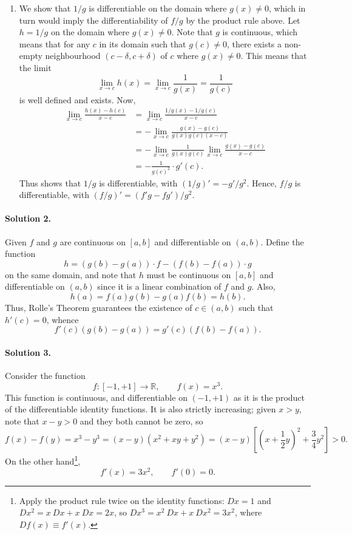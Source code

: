 \documentclass[10pt]{article}
\def\R{\mathbb{R}}
\begin{document}
\begin{enumerate}
        \item We show that $1 /g$ is differentiable on the domain where $g(x) \neq
        0$, which in turn would imply the differentiability of $f / g$ by the
        product rule above. Let $h = 1 /g$ on the domain where $g(x) \neq 0$. Note
        that $g$ is continuous, which means that for any $c$ in its domain such that
        $g(c) \neq 0$, there exists a non-empty neighbourhood $(c - \delta, c +
        \delta)$ of $c$ where $g(x) \neq 0$. This means that the limit \[
            \lim_{x \to c} h(x) = \lim_{x \to c} \frac{1}{g(x)} = \frac{1}{g(c)}
        \] is well defined and exists. Now, 
        \begin{align*}
            \lim_{x \to c} \frac{h(x) - h(c)}{x - c} 
                &= \lim_{x \to c} \frac{1 /g(x) - 1 /g(c)}{x - c} \\
                &= -\lim_{x \to c} \frac{g(x) - g(c)}{g(x)g(c) (x - c)} \\
                &= -\lim_{x \to c} \frac{1}{g(x)g(c)} \lim_{x \to c} \frac{g(x) -
                g(c)}{x - c} \\
                &= -\frac{1}{g(c)^2}\cdot g'(c).
        \end{align*}
        Thus shows that $1 /g$ is differentiable, with $(1 /g)' = -g' / g^2$. Hence,
        $f /g$ is differentiable, with $(f /g)' = (f'g - fg')/g^2$.
    \end{enumerate}

    \paragraph{Solution 2.} Given $f$ and $g$ are continuous on $[a, b]$ and
    differentiable on $(a, b)$. Define the function \[
        h = (g(b) - g(a))\cdot f - (f(b) - f(a))\cdot g
    \] on the same domain, and note that $h$ must be continuous on $[a, b]$ and
    differentiable on $(a, b)$ since it is a linear combination of $f$ and $g$.
    Also, \[
        h(a) = f(a)g(b) - g(a)f(b) = h(b).
    \] Thus, Rolle's Theorem guarantees the existence of $c \in (a, b)$ such that
    $h'(c) = 0$, whence \[
        f'(c)(g(b) - g(a)) = g'(c)(f(b) - f(a)).
    \] 

    \paragraph{Solution 3.} Consider the function \[
        f\colon [-1, +1] \to \R, \qquad f(x) = x^3.
    \] This function is continuous, and differentiable on $(-1, +1)$ as it is the
    product of the differentiable identity functions. It is also strictly
    increasing; given $x > y$, note that $x - y > 0$ and they both cannot be zero, 
    so \[
        f(x) - f(y) = x^3 - y^3 = (x - y)(x^2 + xy + y^2) 
        = (x - y)\left[\left(x + \frac{1}{2}y\right)^2 + \frac{3}{4}y^2\right] > 0.
        \] On the other hand\footnote{
            Apply the product rule twice on the identity functions: $Dx = 1$ and  
            $Dx^2 = x\:Dx + x\:Dx = 2x$, so $Dx^3 = x^2\:Dx + x\:Dx^2 = 3x^2$, where
            $Df(x) \equiv f'(x)$.
        }, \[
        f'(x) = 3x^2, \qquad f'(0) = 0.
    \] 
\end{document}

